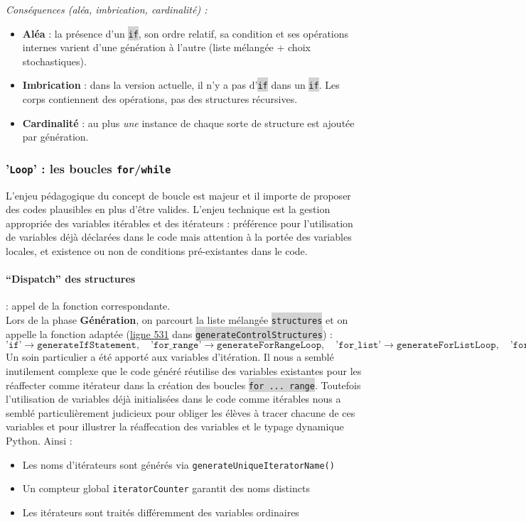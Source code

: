 \documentclass[11pt,a4paper]{article}
\newcommand{\code}[1]{\colorbox{lightgray}{\texttt{\small #1}}}
\begin{document}
\emph{Conséquences (aléa, imbrication, cardinalité) :} 
\begin{itemize}
  \item \textbf{Aléa} : la présence d'un \code{if}, son ordre relatif, sa condition et ses opérations internes varient d'une génération à l'autre (liste mélangée + choix stochastiques).
  \item \textbf{Imbrication} : dans la version actuelle, il n'y a pas d'\code{if} dans un \code{if}. Les corps contiennent des opérations, pas des structures récursives.
  \item \textbf{Cardinalité} : au plus \emph{une} instance de chaque sorte de structure est ajoutée par génération.
\end{itemize}


\subsubsection{'\texttt{Loop}' : les boucles \texttt{for}/\texttt{while}}
L'enjeu pédagogique du concept de boucle est majeur et il importe de proposer des codes plausibles en plus d'être valides. L'enjeu technique est la gestion appropriée des variables itérables et des itérateurs : préférence pour l'utilisation de variables déjà déclarées dans le code mais attention à la portée des variables locales, et existence ou non de conditions pré-existantes dans le code.

\paragraph{``Dispatch'' des structures} :  appel de la fonction correspondante. \\
Lors de la phase \textbf{Génération}, on parcourt la liste mélangée \code{structures} et on appelle la fonction adaptée (\href{https://github.com/edu-mateescoj/gyminf/blob/main/static/js/code-generator.js#L1083}{ligne 531} dans \code{generateControlStructures}) :
\[
\texttt{'if'} \to \texttt{generateIfStatement},\quad
\texttt{'for\_range'} \to \texttt{generateForRangeLoop},\quad
\texttt{'for\_list'} \to \texttt{generateForListLoop},\quad
\texttt{'for\_str'} \to \texttt{generateForStrLoop},\quad
\texttt{'while'} \to \texttt{generateWhileLoop},\quad
\texttt{'function'} \to \texttt{generateFunction}.
\]
Un soin particulier a été apporté aux variables d'itération. Il nous a semblé inutilement complexe que le code généré réutilise des variables existantes pour les réaffecter comme itérateur dans la création des boucles \code{for ... range}. Toutefois l'utilisation de variables déjà initialisées dans le code comme itérables nous a semblé particulièrement judicieux pour obliger les élèves à tracer chacune de ces variables et pour illustrer la réaffecation des variables et le typage dynamique Python. Ainsi :
\begin{itemize}
    \item Les noms d'itérateurs sont générés via \texttt{generateUniqueIteratorName()}
    \item Un compteur global \texttt{iteratorCounter} garantit des noms distincts
    \item Les itérateurs sont traités différemment des variables ordinaires
\end{itemize}
\end{document}
